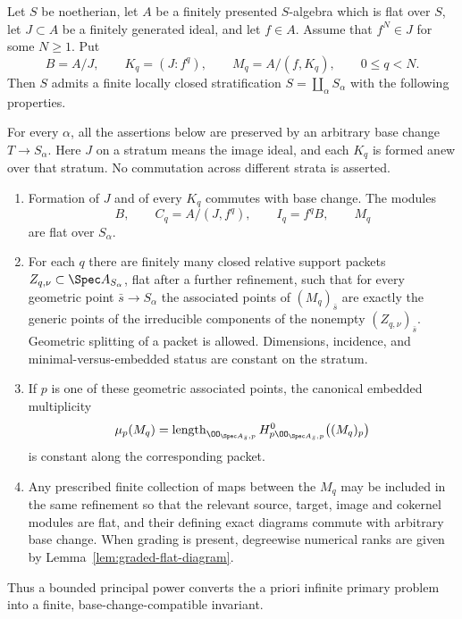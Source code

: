 \begin{theorem}
\label{thm:bounded-principal-colon-stratification}
Let \(S\) be noetherian, let \(A\) be a finitely presented
\(S\)-algebra which is flat over \(S\), let \(J\subset A\) be a
finitely generated ideal, and let \(f\in A\).  Assume that
\(f^N\in J\) for some \(N\ge1\).  Put
\[
 B=A/J,\qquad
 K_q=(J:f^q),\qquad
 M_q=A/(f,K_q),\qquad 0\le q<N.
\]
Then \(S\) admits a finite locally closed stratification
\(S=\coprod_\alpha S_\alpha\) with the following properties.

For every \(\alpha\), all the assertions below are preserved by an
arbitrary base change \(T\to S_\alpha\).  Here \(J\) on a stratum
means the image ideal, and each \(K_q\) is formed anew over that stratum.
No commutation across different strata is asserted.
\begin{enumerate}
\item Formation of \(J\) and of every \(K_q\) commutes with base
change.  The modules
\[
 B,\qquad C_q=A/(J,f^q),\qquad
 I_q=f^qB,\qquad M_q
\]
are flat over \(S_\alpha\).
\item For each \(q\) there are finitely many closed relative support
packets \(Z_{q,\nu}\subset\Spec A_{S_\alpha}\), flat after a further
refinement, such that for every geometric point \(\bar s\to S_\alpha\)
the associated points of \((M_q)_{\bar s}\) are exactly the generic
points of the irreducible components of the nonempty
\((Z_{q,\nu})_{\bar s}\).  Geometric splitting of a packet is allowed.
Dimensions, incidence, and minimal-versus-embedded status are constant
on the stratum.
\item If \(p\) is one of these geometric associated points, the
canonical embedded multiplicity
\[
 \mu_p(M_q)=
 \operatorname{length}_{\OO_{\Spec A_{\bar s},p}}
 H^0_{p\OO_{\Spec A_{\bar s},p}}\bigl((M_q)_p\bigr)
\]
is constant along the corresponding packet.
\item Any prescribed finite collection of maps between the \(M_q\)
may be included in the same refinement so that the relevant source,
target, image and cokernel modules are flat, and their defining exact
diagrams commute with arbitrary base change.  When grading is present,
degreewise numerical ranks are given by Lemma~\ref{lem:graded-flat-diagram}.
\end{enumerate}
Thus a bounded principal power converts the a priori infinite
primary problem into a finite, base-change-compatible invariant.
\end{theorem}

